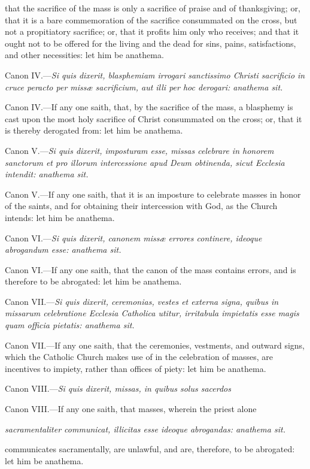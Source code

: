 that the sacrifice of the mass is only a sacrifice of praise and of thanksgiving; or, that it is a bare commemoration of the sacrifice consummated on the cross, but not a propitiatory sacrifice; or, that it profits him only who receives; and that it ought not to be offered for the living and the dead for sins, pains, satisfactions, and other necessities: let him be anathema.

Canon IV.—\emph{Si quis dixerit, blasphemiam irrogari sanctissimo Christi sacrificio in cruce peracto per missæ sacrificium, aut illi per hoc derogari: anathema sit.}

Canon IV.—If any one saith, that, by the sacrifice of the mass, a blasphemy is cast upon the most holy sacrifice of Christ consummated on the cross; or, that it is thereby derogated from: let him be anathema.

Canon V.—\emph{Si quis dixerit, imposturam esse, missas celebrare in honorem sanctorum et pro illorum intercessione apud Deum obtinenda, sicut Ecclesia intendit: anathema sit.}

Canon V.—If any one saith, that it is an imposture to celebrate masses in honor of the saints, and for obtaining their intercession with God, as the Church intends: let him be anathema.

Canon VI.—\emph{Si quis dixerit, canonem missæ errores continere, ideoque abrogandum esse: anathema sit.}

Canon VI.—If any one saith, that the canon of the mass contains errors, and is therefore to be abrogated: let him be anathema.

Canon VII.—\emph{Si quis dixerit, ceremonias, vestes et externa signa, quibus in missarum celebratione Ecclesia Catholica utitur, irritabula impietatis esse magis quam officia pietatis: anathema sit.}

Canon VII.—If any one saith, that the ceremonies, vestments, and outward signs, which the Catholic Church makes use of in the celebration of masses, are incentives to impiety, rather than offices of piety: let him be anathema.

Canon VIII.—\emph{Si quis dixerit, missas, in quibus solus sacerdos }

Canon VIII.—If any one saith, that masses, wherein the priest alone

\emph{sacramentaliter communicat, illicitas esse ideoque abrogandas: anathema sit.}

communicates sacramentally, are unlawful, and are, therefore, to be abrogated: let him be anathema.

